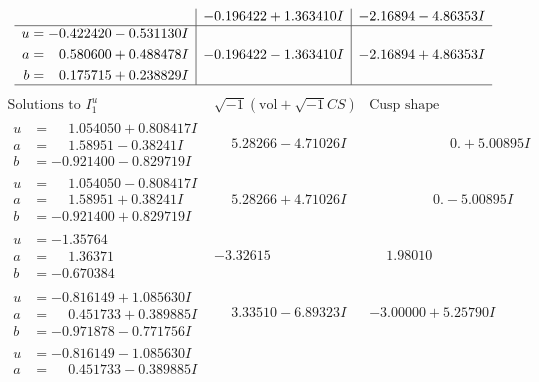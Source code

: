 \documentclass[1p]{elsarticle_modified}
\theoremstyle{definition}
\newcommand{\I}{\sqrt{-1}}
\begin{document}
$$\begin{array}{c|c|c}
 & -0.196422 + 1.363410 I & -2.16894 - 4.86353 I \\ \hline\begin{aligned}
u &= -0.422420 - 0.531130 I \\
a &= \phantom{-}0.580600 + 0.488478 I \\
b &= \phantom{-}0.175715 + 0.238829 I\end{aligned}
 & -0.196422 - 1.363410 I & -2.16894 + 4.86353 I\\
 \hline 
 \end{array}$$\newpage$$\begin{array}{c|c|c}  
\text{Solutions to }I^u_{1}& \I (\text{vol} + \sqrt{-1}CS) & \text{Cusp shape}\\
 \hline 
\begin{aligned}
u &= \phantom{-}1.054050 + 0.808417 I \\
a &= \phantom{-}1.58951 - 0.38241 I \\
b &= -0.921400 - 0.829719 I\end{aligned}
 & \phantom{-}5.28266 - 4.71026 I & \phantom{-0.000000 -}0. + 5.00895 I \\ \hline\begin{aligned}
u &= \phantom{-}1.054050 - 0.808417 I \\
a &= \phantom{-}1.58951 + 0.38241 I \\
b &= -0.921400 + 0.829719 I\end{aligned}
 & \phantom{-}5.28266 + 4.71026 I & \phantom{-0.000000 } 0. - 5.00895 I \\ \hline\begin{aligned}
u &= -1.35764\phantom{ +0.000000I} \\
a &= \phantom{-}1.36371\phantom{ +0.000000I} \\
b &= -0.670384\phantom{ +0.000000I}\end{aligned}
 & -3.32615\phantom{ +0.000000I} & \phantom{-}1.98010\phantom{ +0.000000I} \\ \hline\begin{aligned}
u &= -0.816149 + 1.085630 I \\
a &= \phantom{-}0.451733 + 0.389885 I \\
b &= -0.971878 - 0.771756 I\end{aligned}
 & \phantom{-}3.33510 - 6.89323 I & -3.00000 + 5.25790 I \\ \hline\begin{aligned}
u &= -0.816149 - 1.085630 I \\
a &= \phantom{-}0.451733 - 0.389885 I \\

\end{aligned}
\end{array}$$
\end{document}
